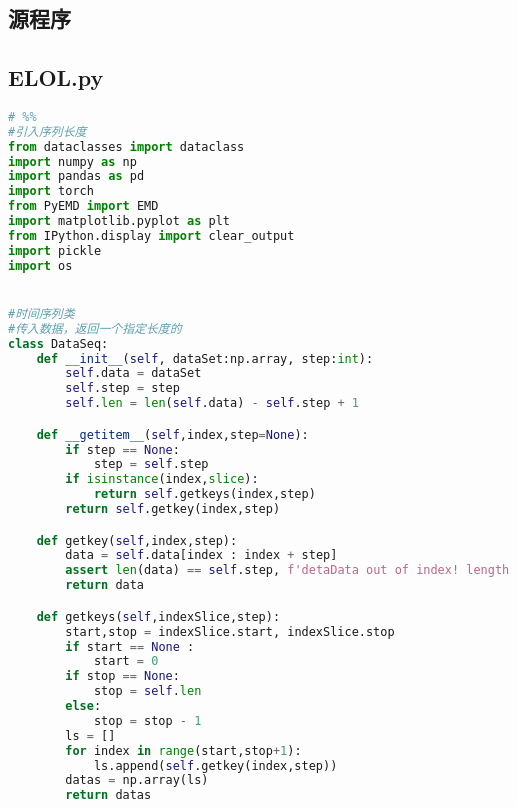 



	
	

	
	
	
	
	
	

\printbibliography
\newpage
\begin{appendices}

\section{源程序}
\subsection{ELOL.py} %
\label{sub:elol}

\begin{lstlisting}[language=python]
# %%
#引入序列长度
from dataclasses import dataclass
import numpy as np
import pandas as pd
import torch
from PyEMD import EMD
import matplotlib.pyplot as plt
from IPython.display import clear_output
import pickle
import os


#时间序列类
#传入数据，返回一个指定长度的
class DataSeq:
    def __init__(self, dataSet:np.array, step:int):
        self.data = dataSet
        self.step = step
        self.len = len(self.data) - self.step + 1

    def __getitem__(self,index,step=None):
        if step == None:
            step = self.step
        if isinstance(index,slice):
            return self.getkeys(index,step)
        return self.getkey(index,step)

    def getkey(self,index,step):
        data = self.data[index : index + step]
        assert len(data) == self.step, f'detaData out of index! length is {self.len} but index is {index}'
        return data

    def getkeys(self,indexSlice,step):
        start,stop = indexSlice.start, indexSlice.stop
        if start == None :
            start = 0
        if stop == None:
            stop = self.len
        else:
            stop = stop - 1
        ls = []
        for index in range(start,stop+1):
            ls.append(self.getkey(index,step))
        datas = np.array(ls)
        return datas


\end{lstlisting}
\end{appendices}
